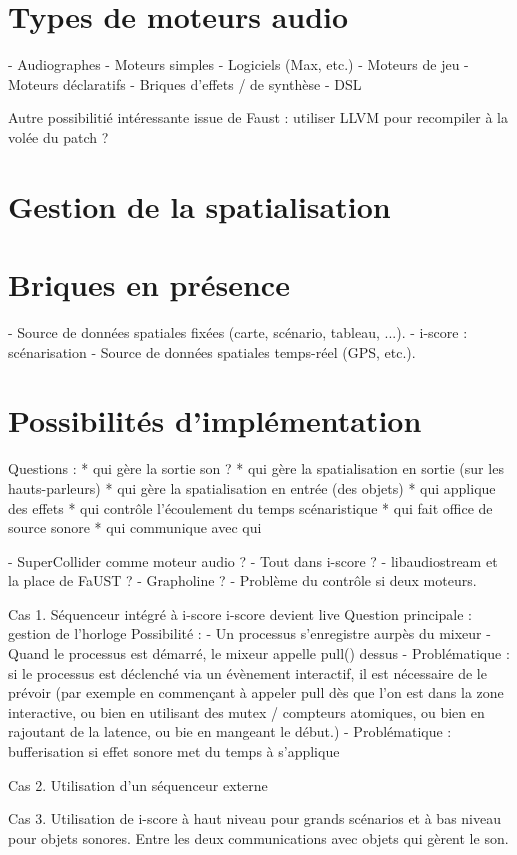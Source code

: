 \documentclass[french,12pt,a4paper]{article}
\begin{document}
\section{Types de moteurs audio}
- Audiographes
- Moteurs simples
- Logiciels (Max, etc.)
- Moteurs de jeu
- Moteurs déclaratifs
- Briques d'effets / de synthèse
- DSL

Autre possibilitié intéressante issue de Faust : utiliser LLVM pour recompiler 
à la volée du patch ?
\section{Gestion de la spatialisation}

\section{Briques en présence}
- Source de données spatiales fixées (carte, scénario, tableau, ...).
- i-score : scénarisation
- Source de données spatiales temps-réel (GPS, etc.).

\section{Possibilités d'implémentation}
Questions : 
* qui gère la sortie son ?
* qui gère la spatialisation en sortie (sur les hauts-parleurs)
* qui gère la spatialisation en entrée (des objets)
* qui applique des effets
* qui contrôle l'écoulement du temps scénaristique
* qui fait office de source sonore
* qui communique avec qui

- SuperCollider comme moteur audio ?
- Tout dans i-score ? 
- libaudiostream et la place de FaUST ?
- Grapholine ?
- Problème du contrôle si deux moteurs.

Cas 1. Séquenceur intégré à i-score
i-score devient live
Question principale : gestion de l'horloge
Possibilité : 
- Un processus s'enregistre aurpès du mixeur
- Quand le processus est démarré, le mixeur appelle pull() dessus
- Problématique : si le processus est déclenché via un évènement interactif, il est nécessaire de le prévoir (par exemple en commençant à appeler pull dès que l'on est dans la zone interactive, ou bien en utilisant des mutex / compteurs atomiques, ou bien en rajoutant de la latence, ou bie en mangeant le début.)
- Problématique : bufferisation si effet sonore met du temps à s'applique

Cas 2. Utilisation d'un séquenceur externe

Cas 3. Utilisation de i-score à haut niveau pour grands scénarios et à bas niveau pour objets sonores.
Entre les deux communications avec objets qui gèrent le son.
\end{document}
